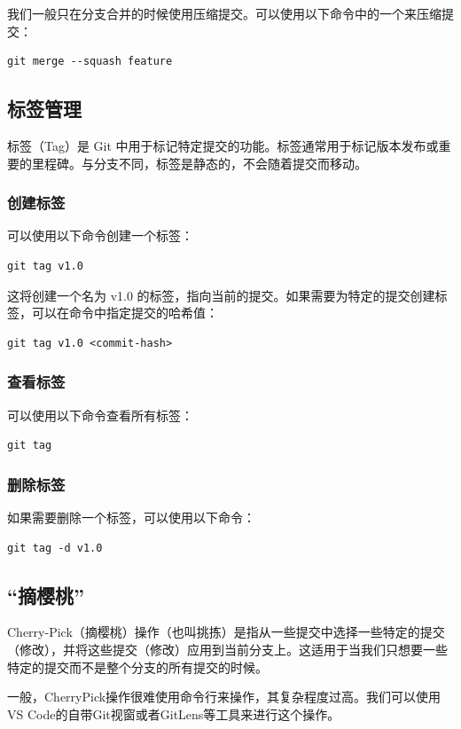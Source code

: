 \documentclass[fontset=none]{ctexart}
\begin{document}
我们一般只在分支合并的时候使用压缩提交。可以使用以下命令中的一个来压缩提交：
\begin{verbatim}
git merge --squash feature
\end{verbatim}

\subsection{标签管理}
标签（Tag）是 Git 中用于标记特定提交的功能。标签通常用于标记版本发布或重要的里程碑。与分支不同，标签是静态的，不会随着提交而移动。

\subsubsection{创建标签}
可以使用以下命令创建一个标签：
\begin{verbatim}
git tag v1.0
\end{verbatim}

这将创建一个名为 v1.0 的标签，指向当前的提交。如果需要为特定的提交创建标签，可以在命令中指定提交的哈希值：
\begin{verbatim}
git tag v1.0 <commit-hash>
\end{verbatim}

\subsubsection{查看标签}
可以使用以下命令查看所有标签：
\begin{verbatim}
git tag
\end{verbatim}

\subsubsection{删除标签}
如果需要删除一个标签，可以使用以下命令：
\begin{verbatim}
git tag -d v1.0
\end{verbatim}

\subsection{“摘樱桃”}

Cherry-Pick（摘樱桃）操作（也叫挑拣）是指从一些提交中选择一些特定的提交（修改），并将这些提交（修改）应用到当前分支上。这适用于当我们只想要一些特定的提交而不是整个分支的所有提交的时候。

一般，CherryPick操作很难使用命令行来操作，其复杂程度过高。我们可以使用VS Code的自带Git视窗或者GitLens等工具来进行这个操作。
\end{document}
